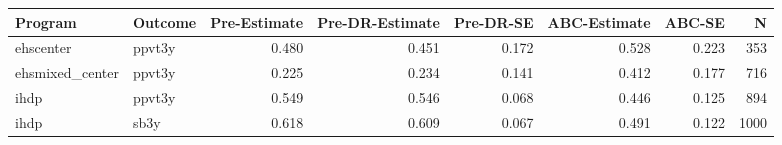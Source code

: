 \begin{table}[ht]
\centering
\begin{tabular}{llrrrrrr}
  \hline
Program & Outcome & Pre-Estimate & Pre-DR-Estimate & Pre-DR-SE & ABC-Estimate & ABC-SE & N \\ 
  \hline
ehscenter & ppvt3y & 0.480 & 0.451 & 0.172 & 0.528 & 0.223 & 353 \\ 
  ehsmixed\_center & ppvt3y & 0.225 & 0.234 & 0.141 & 0.412 & 0.177 & 716 \\ 
  ihdp & ppvt3y & 0.549 & 0.546 & 0.068 & 0.446 & 0.125 & 894 \\ 
  ihdp & sb3y & 0.618 & 0.609 & 0.067 & 0.491 & 0.122 & 1000 \\ 
   \hline
\end{tabular}
\end{table}
